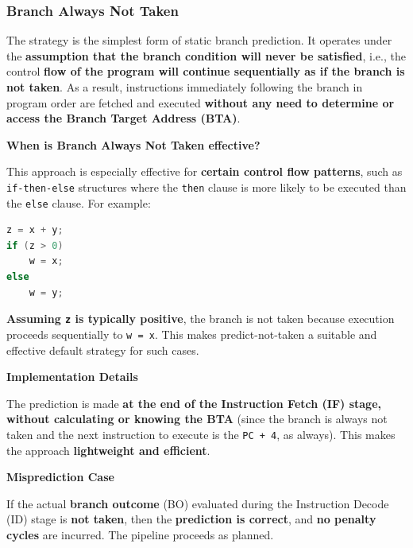 \subsubsection{Branch Always Not Taken}\label{subsubsection: Branch Always Not Taken}

The  strategy is the simplest form of static branch prediction. It operates under the \textbf{assumption that the branch condition will never be satisfied}, i.e., the control \textbf{flow of the program will continue sequentially as if the branch is not taken}. As a result, instructions immediately following the branch in program order are fetched and executed \textbf{without any need to determine or access the Branch Target Address (BTA)}.

\highspace
\begin{flushleft}
    \textcolor{Green3}{ \textbf{When is Branch Always Not Taken effective?}}
\end{flushleft}
This approach is especially effective for \textbf{certain control flow patterns}, such as \texttt{if-then-else} structures where the \texttt{then} clause is more likely to be executed than the \texttt{else} clause. For example:
\begin{lstlisting}[language=c]
z = x + y;
if (z > 0)
    w = x;
else
    w = y;\end{lstlisting}
\textbf{Assuming \texttt{z} is typically positive}, the branch is not taken because execution proceeds sequentially to \texttt{w = x}. This makes predict-not-taken a suitable and effective default strategy for such cases.

\highspace
\begin{flushleft}
    \textcolor{Green3}{ \textbf{Implementation Details}}
\end{flushleft}
The prediction is made \textbf{at the end of the Instruction Fetch (IF) stage, without calculating or knowing the BTA} (since the branch is always not taken and the next instruction to execute is the \texttt{PC + 4}, as always). This makes the approach \textcolor{Green3}{\textbf{lightweight and efficient}}.

\highspace
\begin{flushleft}
    \textcolor{Red2}{ \textbf{Misprediction Case}}
\end{flushleft}
If the actual \textbf{branch outcome} (BO) evaluated during the Instruction Decode (ID) stage is \textbf{not taken}, then the \textbf{prediction is correct}, and \textbf{no penalty cycles} are incurred. The pipeline proceeds as planned.

